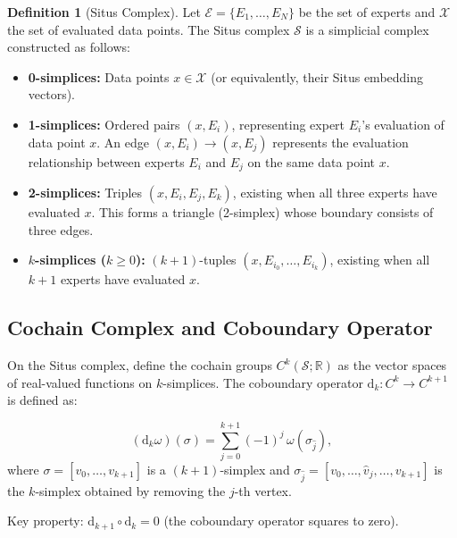 \documentclass[12pt,a4paper]{article}
\theoremstyle{plain}
\theoremstyle{definition}
\newtheorem{definition}[theorem]{Definition}
\theoremstyle{remark}
\newcommand{\R}{\mathbb{R}}
\newcommand{\dd}{\mathrm{d}}
\newcommand{\SSS}{\mathcal{S}}
\begin{document}
\begin{definition}[Situs Complex]
\label{def:situs_complex}
Let $\mathcal{E} = \{E_1, \ldots, E_N\}$ be the set of experts and $\mathcal{X}$ the set of evaluated data points. The Situs complex $\SSS$ is a simplicial complex constructed as follows:

\begin{itemize}
    \item \textbf{0-simplices:} Data points $x \in \mathcal{X}$ (or equivalently, their Situs embedding vectors).
    \item \textbf{1-simplices:} Ordered pairs $(x, E_i)$, representing expert $E_i$'s evaluation of data point $x$. An edge $(x,E_i) \to (x,E_j)$ represents the evaluation relationship between experts $E_i$ and $E_j$ on the same data point $x$.
    \item \textbf{2-simplices:} Triples $(x, E_i, E_j, E_k)$, existing when all three experts have evaluated $x$. This forms a triangle (2-simplex) whose boundary consists of three edges.
    \item \textbf{$k$-simplices ($k \geq 0$):} $(k+1)$-tuples $(x, E_{i_0}, \ldots, E_{i_k})$, existing when all $k+1$ experts have evaluated $x$.
\end{itemize}
\end{definition}

\subsection{Cochain Complex and Coboundary Operator}
\label{sec:cochain}

On the Situs complex, define the cochain groups $C^k(\SSS; \R)$ as the vector spaces of real-valued functions on $k$-simplices. The coboundary operator $\dd_k: C^k \to C^{k+1}$ is defined as:

\begin{equation}\label{eq:coboundary}
    (\dd_k \omega)(\sigma) = \sum_{j=0}^{k+1} (-1)^j \, \omega(\sigma_{\hat{j}}),
\end{equation}
where $\sigma = [v_0, \ldots, v_{k+1}]$ is a $(k+1)$-simplex and $\sigma_{\hat{j}} = [v_0, \ldots, \hat{v}_j, \ldots, v_{k+1}]$ is the $k$-simplex obtained by removing the $j$-th vertex.

Key property: $\dd_{k+1} \circ \dd_k = 0$ (the coboundary operator squares to zero).
\end{document}
